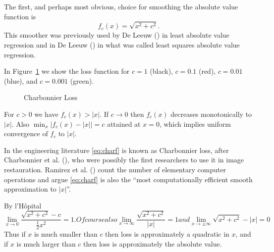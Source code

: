 \documentclass[
  12pt,
  letterpaper,
  DIV=11,
  numbers=noendperiod]{scrartcl}
\theoremstyle{plain}
\theoremstyle{remark}
\begin{document}
The first, and perhaps most obvious, choice for smoothing the absolute
value function is \begin{equation}
f_c(x)=\sqrt{x^2 + c^2}.\label{eq:charf}
\end{equation} This smoother was previously used by De Leeuw
() in least absolute value regression
and in De Leeuw () in what was called
least squares absolute value regression.

In Figure~\ref{fig-charfig} we show the loss function for \(c=1\)
(black), \(c=0.1\) (red), \(c=0.01\) (blue), and \(c=0.001\) (green).

\begin{figure}


\caption{\label{fig-charfig}Charbonnier Loss}

\end{figure}%

For \(c>0\) we have \(f_c(x)>|x|\). If \(c\rightarrow 0\) then
\(f_c(x)\) decreases monotonically to \(|x|\). Also
\(\min_x|f_c(x)-|x||=c\) attained at \(x=0\), which implies uniform
convergence of \(f_c\) to \(|x|\).

In the engineering literature \eqref{eq:charf} is known as Charbonnier
loss, after Charbonnier et al.
(), who
were possibly the first researchers to use it in image restauration.
Ramirez et al.
() count the
number of elementary computer operations and argue \eqref{eq:charf} is
also the ``most computationally efficient smooth approximation to
\(|x|\)''.

By l'Hôpital \begin{subequations}
\begin{equation}
\lim_{x\rightarrow 0}\frac{\sqrt{x^2+c^2}-c}{\frac12x^2}=1.
\end{equation}
Of course also
\begin{equation}
\lim_{x\rightarrow\infty}\frac{\sqrt{x^2+c^2}}{|x|}=1
\end{equation}
and
\begin{equation}
\lim_{x\rightarrow\pm\infty}\sqrt{x^2+c^2}-|x|=0
\end{equation}
\end{subequations} Thus if \(x\) is much smaller than \(c\) then loss is
approximately a quadratic in \(x\), and if \(x\) is much larger than
\(c\) then loss is approximately the absolute value.
\end{document}
